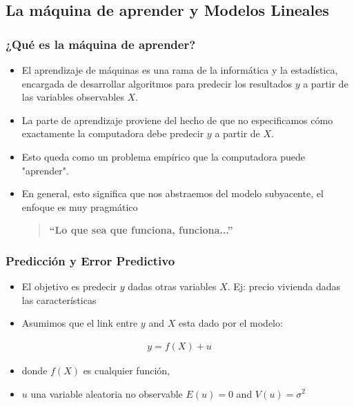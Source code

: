 \documentclass[
  shownotes,
  xcolor={svgnames},
  hyperref={colorlinks,citecolor=DarkBlue,linkcolor=DarkRed,urlcolor=DarkBlue}
  , aspectratio=169]{beamer}
\begin{document}
\subsection{La máquina de aprender y Modelos Lineales} 
\begin{frame}
\frametitle{¿Qué es la máquina de aprender?}

\begin{itemize}
  \item El aprendizaje de máquinas es una rama de la informática y la estadística, encargada de desarrollar algoritmos para predecir los resultados $y$ a partir de las variables observables $X$.
  \medskip
  \item La parte de aprendizaje proviene del hecho de que no especificamos cómo exactamente la computadora debe predecir $y$ a partir de $X$.
  \medskip
   \item Esto queda como un problema empírico que la computadora puede "aprender".
   \medskip
  \item En general, esto significa que nos abstraemos del modelo subyacente, el enfoque es muy pragmático
  
  \bigskip
  \bigskip

  \pause
  \begin{quote}
  \centering
  \bf ``Lo que sea que funciona, funciona...''
  \end{quote}
\end{itemize}

\end{frame}
\begin{frame}
\frametitle{Predicción y Error Predictivo}


\begin{itemize}
  \item El objetivo es predecir $y$ dadas otras variables $X$. Ej: precio vivienda dadas las características
  \bigskip
  \item Asumimos que el link entre $y$ and $X$ esta dado por el modelo:
\end{itemize}
\bigskip
\begin{align}
  y = f(X) + u
\end{align}
\bigskip
\begin{itemize}
  \item donde $f(X)$ es cualquier función, 
  \bigskip
  \item  $u$ una variable aleatoria no observable $E(u)=0$ and $V(u) = \sigma^2$
\end{itemize}


\end{frame}
\end{document}
